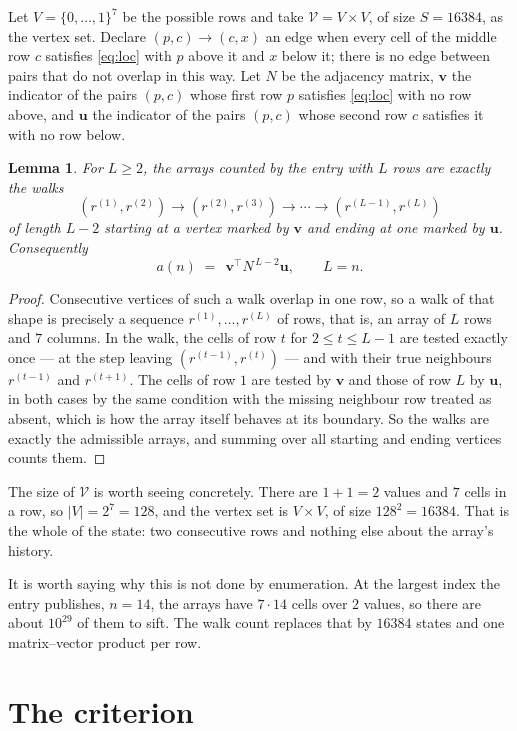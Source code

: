 \documentclass[11pt,a4paper]{article}
\theoremstyle{plain}
\newtheorem{lemma}[theorem]{Lemma}
\theoremstyle{definition}
\begin{document}
Let $V=\{0,\dots,1\}^{7}$ be the possible rows and take
$\mathcal V=V\times V$, of size $S=16384$, as the vertex set. Declare $(p,c)\to(c,x)$ an edge
when every cell of the middle row $c$ satisfies \eqref{eq:loc} with $p$ above it and $x$
below it; there is no edge between pairs that do not overlap in this way. Let $N$ be the
adjacency matrix, $\mathbf{v}$ the indicator of the pairs $(p,c)$ whose first row $p$
satisfies \eqref{eq:loc} with no row above, and $\mathbf{u}$ the indicator of
the pairs $(p,c)$ whose second row $c$ satisfies it with no row below.

\begin{lemma}\label{lem:walk}
For $L\ge2$, the arrays counted by the entry with $L$ rows are exactly the walks
\[
(r^{(1)},r^{(2)})\to(r^{(2)},r^{(3)})\to\cdots\to(r^{(L-1)},r^{(L)})
\]
of length $L-2$ starting at a vertex marked by $\mathbf{v}$ and ending at one marked by
$\mathbf{u}$. Consequently
\[
a(n)\;=\;\,\mathbf{v}^{\!\top}N^{\,L-2}\mathbf{u},\qquad L=n .
\]
\end{lemma}

\begin{proof}
Consecutive vertices of such a walk overlap in one row, so a walk of that shape is
precisely a sequence $r^{(1)},\dots,r^{(L)}$ of rows, that is, an array of $L$ rows
and $7$ columns. In the walk, the cells of row $t$ for $2\le t\le L-1$ are tested
exactly once --- at the step leaving $(r^{(t-1)},r^{(t)})$ --- and with their true
neighbours $r^{(t-1)}$ and $r^{(t+1)}$. The cells of row $1$ are tested by
$\mathbf{v}$ and those of row $L$ by $\mathbf{u}$, in both cases by the same condition
with the missing neighbour row treated as absent, which is how the array itself behaves at
its boundary. So the walks are exactly the admissible arrays, and summing over all starting
and ending vertices counts them.
\end{proof}


The size of $\mathcal V$ is worth seeing concretely. There are $1+1=2$ values
and $7$ cells in a row, so $|V|=2^{7}=128$, and the vertex set is
$V\times V$, of size $128^2=16384$. That is the whole of the state: two consecutive
rows and nothing else about the array's history.

It is worth saying why this is not done by enumeration. At the largest index the entry
publishes, $n=14$, the arrays have $7\cdot14$ cells over
$2$ values, so there are about $10^{29}$ of them to sift. The
walk count replaces that by $16384$ states and one matrix--vector product per row.
\section{The criterion}
\end{document}
